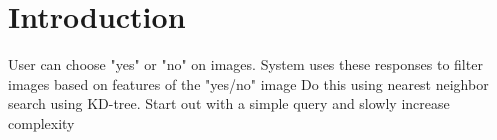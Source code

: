 \section{Introduction}

User can choose "yes" or "no" on images.
System uses these responses to filter images based on features of the "yes/no" image
Do this using nearest neighbor search using KD-tree. Start out with a simple query and slowly increase complexity

